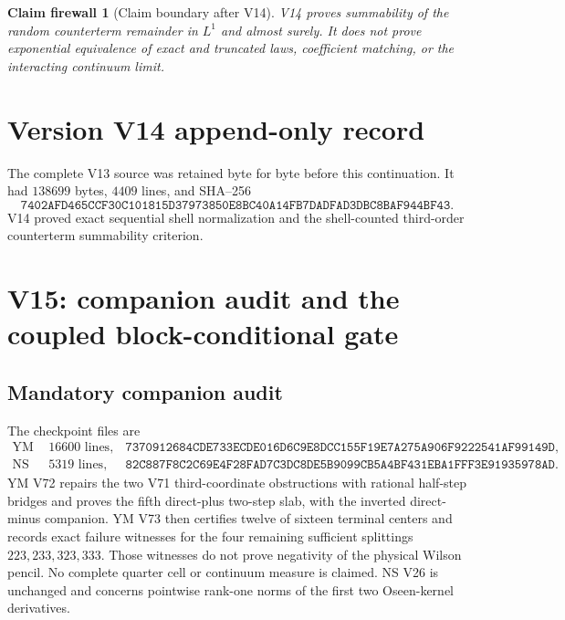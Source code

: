 \documentclass[11pt]{article}
\newtheorem{firewall}[theorem]{Claim firewall}
\theoremstyle{remark}
\begin{document}
\begin{firewall}[Claim boundary after V14]
\label{fire:v17v14}
V14 proves summability of the random counterterm remainder in
\(L^1\) and almost surely.  It does not prove exponential
equivalence of exact and truncated laws, coefficient matching, or
the interacting continuum limit.
\end{firewall}

\section*{Version V14 append-only record}
The complete V13 source was retained byte for byte before this
continuation.  It had \(138699\) bytes, \(4409\) lines, and SHA--256
\[
 \texttt{7402AFD465CCF30C101815D37973850E8BC40A14FB7DADFAD3DBC8BAF944BF43}.
\]
V14 proved exact sequential shell normalization and the
shell-counted third-order counterterm summability criterion.


\section{V15: companion audit and the coupled block-conditional gate}
\label{sec:v17v15}

\subsection{Mandatory companion audit}

The checkpoint files are
\[
\begin{array}{lll}
\text{YM V73:}&16600\text{ lines},&
\texttt{7370912684CDE733ECDE016D6C9E8DCC155F19E7A275A906F9222541AF99149D},\\
\text{NS V26:}&5319\text{ lines},&
\texttt{82C887F8C2C69E4F28FAD7C3DC8DE5B9099CB5A4BF431EBA1FFF3E91935978AD}.
\end{array}                                                       \tag{15.1}
\]
YM V72 repairs the two V71 third-coordinate obstructions with
rational half-step bridges and proves the fifth direct-plus
two-step slab, with the inverted direct-minus companion.  YM V73
then certifies twelve of sixteen terminal centers and records exact
failure witnesses for the four remaining sufficient splittings
\(223,233,323,333\).  Those witnesses do not prove negativity of
the physical Wilson pencil.  No complete quarter cell or continuum
measure is claimed.  NS V26 is unchanged and concerns pointwise
rank-one norms of the first two Oseen-kernel derivatives.
\end{document}
